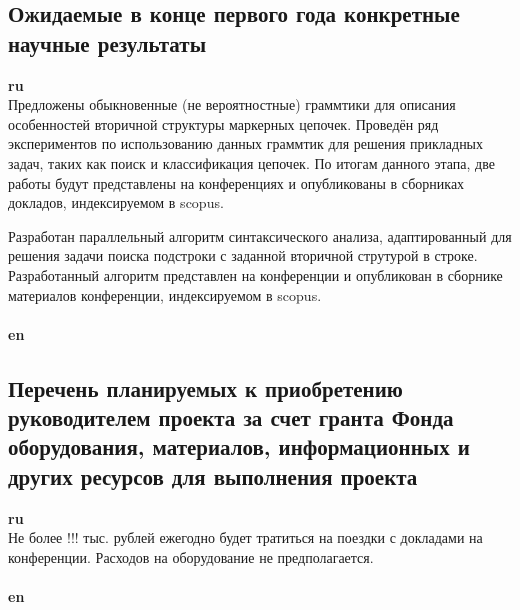 ﻿\documentclass[12pt]{article}  %
\theoremstyle{remark}
\begin{document}
\subsection{Ожидаемые в конце первого года конкретные научные результаты}

\textbf{ru}\\
Предложены обыкновенные (не вероятностные) граммтики для описания особенностей вторичной структуры маркерных цепочек.
Проведён ряд экспериментов по использованию данных граммтик для решения прикладных задач, таких как поиск и классификация цепочек.
По итогам данного этапа, две работы будут представлены на конференциях и опубликованы в сборниках докладов, индексируемом в scopus.

Разработан параллельный алгоритм синтаксического анализа, адаптированный для решения задачи поиска подстроки с заданной вторичной струтурой в строке.
Разработанный алгоритм представлен на конференции и опубликован в сборнике материалов конференции, индексируемом в scopus.
\\
\\
\textbf{en}\\

\subsection{Перечень планируемых к приобретению руководителем проекта за счет гранта Фонда оборудования, материалов, информационных и других ресурсов для выполнения проекта}

\textbf{ru}\\
Не более !!! тыс. рублей ежегодно будет тратиться на поездки с докладами на конференции. Расходов на оборудование не предполагается.
\\
\\
\textbf{en}\\
\end{document}
